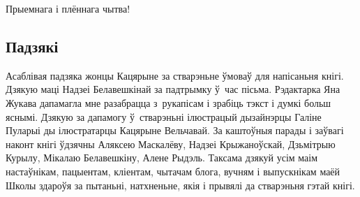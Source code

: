 Прыемнага і плённага чытва!


\subsection{Падзякі}

Асаблівая падзяка жонцы Кацярыне за стварэньне ўмоваў для напісаньня кнігі. Дзякую маці Надзеі Белавешкінай за падтрымку ў~час пісьма. Рэдактарка Яна Жукава дапамагла мне разабрацца з~рукапісам і зрабіць тэкст і думкі больш яснымі. Дзякую за дапамогу ў~стварэньні ілюстрацый дызайнэрцы Галіне Пуларыі ды ілюстратарцы Кацярыне Вельчавай. За каштоўныя парады і заўвагі наконт кнігі ўдзячны Аляксею Маскалёву, Надзеі Крыжаноўскай, Дзьмітрыю Курылу, Мікалаю Белавешкіну, Алене Рыдэль. Таксама дзякуй усім маім настаўнікам, пацыентам, кліентам, чытачам блога, вучням і выпускнікам маёй Школы здароўя за пытаньні, натхненьне, якія і прывялі да стварэньня гэтай кнігі.
